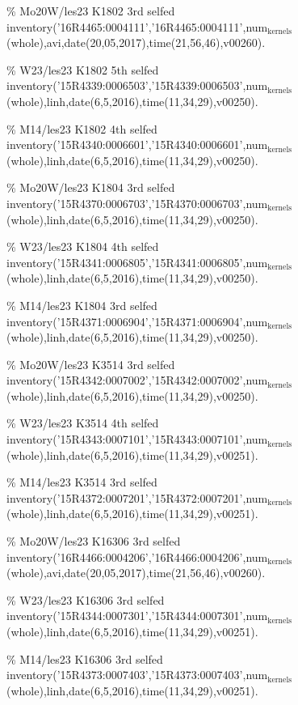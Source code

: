 \documentclass[11pt]{article}
\begin{document}
\% Mo20W/les23 K1802 3rd selfed
inventory('16R4465:0004111','16R4465:0004111',num$_{\text{kernels}}$(whole),avi,date(20,05,2017),time(21,56,46),v00260).

\% W23/les23 K1802 5th selfed 
inventory('15R4339:0006503','15R4339:0006503',num$_{\text{kernels}}$(whole),linh,date(6,5,2016),time(11,34,29),v00250).

\% M14/les23 K1802 4th selfed
inventory('15R4340:0006601','15R4340:0006601',num$_{\text{kernels}}$(whole),linh,date(6,5,2016),time(11,34,29),v00250).





\% Mo20W/les23 K1804 3rd selfed
inventory('15R4370:0006703','15R4370:0006703',num$_{\text{kernels}}$(whole),linh,date(6,5,2016),time(11,34,29),v00250).

\% W23/les23 K1804 4th selfed
inventory('15R4341:0006805','15R4341:0006805',num$_{\text{kernels}}$(whole),linh,date(6,5,2016),time(11,34,29),v00250).

\% M14/les23 K1804 3rd selfed
inventory('15R4371:0006904','15R4371:0006904',num$_{\text{kernels}}$(whole),linh,date(6,5,2016),time(11,34,29),v00250).





\% Mo20W/les23 K3514 3rd selfed
inventory('15R4342:0007002','15R4342:0007002',num$_{\text{kernels}}$(whole),linh,date(6,5,2016),time(11,34,29),v00250).

\% W23/les23 K3514 4th selfed
inventory('15R4343:0007101','15R4343:0007101',num$_{\text{kernels}}$(whole),linh,date(6,5,2016),time(11,34,29),v00251).

\% M14/les23 K3514 3rd selfed
inventory('15R4372:0007201','15R4372:0007201',num$_{\text{kernels}}$(whole),linh,date(6,5,2016),time(11,34,29),v00251).





\% Mo20W/les23 K16306 3rd selfed
inventory('16R4466:0004206','16R4466:0004206',num$_{\text{kernels}}$(whole),avi,date(20,05,2017),time(21,56,46),v00260).

\% W23/les23 K16306 3rd selfed
inventory('15R4344:0007301','15R4344:0007301',num$_{\text{kernels}}$(whole),linh,date(6,5,2016),time(11,34,29),v00251).

\% M14/les23 K16306 3rd selfed
inventory('15R4373:0007403','15R4373:0007403',num$_{\text{kernels}}$(whole),linh,date(6,5,2016),time(11,34,29),v00251).
\end{document}
